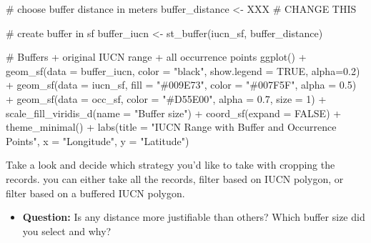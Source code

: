 \documentclass[
  letterpaper,
  DIV=11,
  numbers=noendperiod]{scrartcl}
\newenvironment{Shaded}{\begin{snugshade}}{\end{snugshade}}
\newcommand{\AttributeTok}[1]{\textcolor[rgb]{0.40,0.45,0.13}{#1}}
\newcommand{\CommentTok}[1]{\textcolor[rgb]{0.37,0.37,0.37}{#1}}
\newcommand{\ConstantTok}[1]{\textcolor[rgb]{0.56,0.35,0.01}{#1}}
\newcommand{\DecValTok}[1]{\textcolor[rgb]{0.68,0.00,0.00}{#1}}
\newcommand{\FloatTok}[1]{\textcolor[rgb]{0.68,0.00,0.00}{#1}}
\newcommand{\FunctionTok}[1]{\textcolor[rgb]{0.28,0.35,0.67}{#1}}
\newcommand{\NormalTok}[1]{\textcolor[rgb]{0.00,0.23,0.31}{#1}}
\newcommand{\OtherTok}[1]{\textcolor[rgb]{0.00,0.23,0.31}{#1}}
\newcommand{\SpecialCharTok}[1]{\textcolor[rgb]{0.37,0.37,0.37}{#1}}
\newcommand{\StringTok}[1]{\textcolor[rgb]{0.13,0.47,0.30}{#1}}
\providecommand{\tightlist}{%
  \setlength{\itemsep}{0pt}\setlength{\parskip}{0pt}}
\begin{document}
\begin{Shaded}
\begin{Highlighting}[]
\CommentTok{\# choose buffer distance in meters}
\NormalTok{buffer\_distance }\OtherTok{\textless{}{-}}\NormalTok{ XXX }\CommentTok{\# CHANGE THIS}

\CommentTok{\# create buffer in sf}
\NormalTok{buffer\_iucn }\OtherTok{\textless{}{-}} \FunctionTok{st\_buffer}\NormalTok{(iucn\_sf, buffer\_distance)}

\CommentTok{\# Buffers + original IUCN range + all occurrence points}
\FunctionTok{ggplot}\NormalTok{() }\SpecialCharTok{+}
  \FunctionTok{geom\_sf}\NormalTok{(}\AttributeTok{data =}\NormalTok{ buffer\_iucn, }\AttributeTok{color =} \StringTok{"black"}\NormalTok{, }\AttributeTok{show.legend =} \ConstantTok{TRUE}\NormalTok{, }\AttributeTok{alpha=}\FloatTok{0.2}\NormalTok{) }\SpecialCharTok{+}
  \FunctionTok{geom\_sf}\NormalTok{(}\AttributeTok{data =}\NormalTok{ iucn\_sf, }\AttributeTok{fill =} \StringTok{"\#009E73"}\NormalTok{, }\AttributeTok{color =} \StringTok{"\#007F5F"}\NormalTok{, }\AttributeTok{alpha =} \FloatTok{0.5}\NormalTok{) }\SpecialCharTok{+}
  \FunctionTok{geom\_sf}\NormalTok{(}\AttributeTok{data =}\NormalTok{ occ\_sf, }\AttributeTok{color =} \StringTok{"\#D55E00"}\NormalTok{, }\AttributeTok{alpha =} \FloatTok{0.7}\NormalTok{, }\AttributeTok{size =} \DecValTok{1}\NormalTok{) }\SpecialCharTok{+}
  \FunctionTok{scale\_fill\_viridis\_d}\NormalTok{(}\AttributeTok{name =} \StringTok{"Buffer size"}\NormalTok{) }\SpecialCharTok{+}
  \FunctionTok{coord\_sf}\NormalTok{(}\AttributeTok{expand =} \ConstantTok{FALSE}\NormalTok{) }\SpecialCharTok{+}
  \FunctionTok{theme\_minimal}\NormalTok{() }\SpecialCharTok{+}
  \FunctionTok{labs}\NormalTok{(}\AttributeTok{title =} \StringTok{"IUCN Range with Buffer and Occurrence Points"}\NormalTok{,}
       \AttributeTok{x =} \StringTok{"Longitude"}\NormalTok{, }\AttributeTok{y =} \StringTok{"Latitude"}\NormalTok{)}
\end{Highlighting}
\end{Shaded}

Take a look and decide which strategy you'd like to take with cropping
the records. you can either take all the records, filter based on IUCN
polygon, or filter based on a buffered IUCN polygon.

\begin{itemize}
\tightlist
\item
  \textbf{Question:} Is any distance more justifiable than others? Which
  buffer size did you select and why?
\end{itemize}
\end{document}
